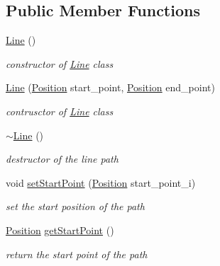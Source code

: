 \subsection*{Public Member Functions}
\begin{DoxyCompactItemize}
\item 
\mbox{\label{class_path2_d_1_1_line_ae5f6a3ad572c2ec06701a32050f42a73}} 
\mbox{\hyperlink{class_path2_d_1_1_line_ae5f6a3ad572c2ec06701a32050f42a73}{Line}} ()
\begin{DoxyCompactList}\small\item\em constructor of \mbox{\hyperlink{class_path2_d_1_1_line}{Line}} class \end{DoxyCompactList}\item 
\mbox{\hyperlink{class_path2_d_1_1_line_a090e0982e8ad1fdc2cb2af716cda408c}{Line}} (\mbox{\hyperlink{class_path2_d_1_1_position}{Position}} start\+\_\+point, \mbox{\hyperlink{class_path2_d_1_1_position}{Position}} end\+\_\+point)
\begin{DoxyCompactList}\small\item\em contrusctor of \mbox{\hyperlink{class_path2_d_1_1_line}{Line}} class \end{DoxyCompactList}\item 
\mbox{\label{class_path2_d_1_1_line_af337b27d2749114d6dd11583b2e7a8b6}} 
\mbox{\hyperlink{class_path2_d_1_1_line_af337b27d2749114d6dd11583b2e7a8b6}{$\sim$\+Line}} ()
\begin{DoxyCompactList}\small\item\em destructor of the line path \end{DoxyCompactList}\item 
void \mbox{\hyperlink{class_path2_d_1_1_line_a981461ff075dfd005665498903c2f1fa}{set\+Start\+Point}} (\mbox{\hyperlink{class_path2_d_1_1_position}{Position}} start\+\_\+point\+\_\+i)
\begin{DoxyCompactList}\small\item\em set the start position of the path \end{DoxyCompactList}\item 
\mbox{\hyperlink{class_path2_d_1_1_position}{Position}} \mbox{\hyperlink{class_path2_d_1_1_line_acc1c9a6fdc72ae5286fc50bdc38a3fa9}{get\+Start\+Point}} ()
\begin{DoxyCompactList}\small\item\em return the start point of the path \end{DoxyCompactList}\item 

\end{DoxyCompactItemize}
